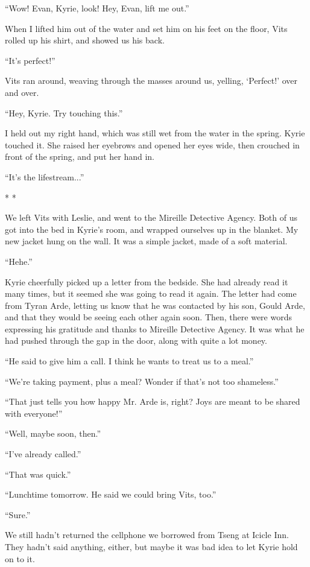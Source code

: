 \documentclass[oneside]{book}
\begin{document}
“Wow! Evan, Kyrie, look! Hey, Evan, lift me out.”

When I lifted him out of the water and set him on his feet on the floor, Vits rolled up his shirt, and showed us his back.

“It’s perfect!”

Vits ran around, weaving through the masses around us, yelling, ‘Perfect!’ over and over.

“Hey, Kyrie. Try touching this.”

I held out my right hand, which was still wet from the water in the spring. Kyrie touched it. She raised her eyebrows and opened her eyes wide, then crouched in front of the spring, and put her hand in.

“It’s the lifestream...”

* *

We left Vits with Leslie, and went to the Mireille Detective Agency. Both of us got into the bed in Kyrie’s room, and wrapped ourselves up in the blanket. My new jacket hung on the wall. It was a simple jacket, made of a soft material.

“Hehe.”

Kyrie cheerfully picked up a letter from the bedside. She had already read it many times, but it seemed she was going to read it again. The letter had come from Tyran Arde, letting us know that he was contacted by his son, Gould Arde, and that they would be seeing each other again soon. Then, there were words expressing his gratitude and thanks to Mireille Detective Agency. It was what he had pushed through the gap in the door, along with quite a lot money.

“He said to give him a call. I think he wants to treat us to a meal.”

“We’re taking payment, plus a meal? Wonder if that’s not too shameless.”

“That just tells you how happy Mr. Arde is, right? Joys are meant to be shared with everyone!”

“Well, maybe soon, then.”

“I’ve already called.”

“That was quick.”

“Lunchtime tomorrow. He said we could bring Vits, too.”

“Sure.”

We still hadn’t returned the cellphone we borrowed from Tseng at Icicle Inn. They hadn’t said anything, either, but maybe it was bad idea to let Kyrie hold on to it.
\end{document}
